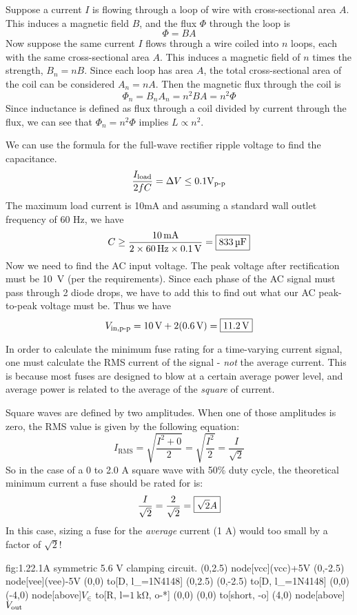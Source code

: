 Suppose a current \(I\) is flowing through a loop of wire with cross-sectional area \(A\).
This induces a magnetic field \(B\), and the flux \(\Phi\) through the loop is
\[\Phi = BA\]
Now suppose the same current \(I\) flows through a wire coiled into \(n\) loops, each with the same cross-sectional area \(A\).
This induces a magnetic field of \(n\) times the strength, \(B_n = nB\). Since each loop has area \(A\),
the total cross-sectional area of the coil can be considered \(A_n = nA\). Then the magnetic flux
through the coil is
\[\Phi_n = B_nA_n = n^2BA = n^2\Phi\]
Since inductance is defined as flux through a coil divided by current through the flux,
we can see that \(\Phi_n = n^2\Phi\) implies \(L \propto n^2\).

We can use the formula for the full-wave rectifier ripple voltage to find the capacitance.
\[\frac{I_{\text{load}}}{2fC} = \Delta V \le 0.1 \text{V}_{\text{p-p}}\]
The maximum load current is 10mA and assuming a standard wall outlet frequency of 60 Hz, we have
\[C \ge \frac{\SI{10}{\mA}}{2\times \SI{60}{\Hz} \times \SI{0.1}{\V}} = \mans{\SI{833}{\micro\farad}}\]
Now we need to find the AC input voltage. The peak voltage after rectification must be \SI{10}{\V} (per the requirements). Since each phase of the AC signal must pass through 2 diode drops, we have to add this to find out what our AC peak-to-peak voltage must be. Thus we have
\[V_{\in, \pp} = \SI{10}{\V} + 2(\SI{0.6}{\V}) = \mans{\SI{11.2}{\V}}\]

In order to calculate the minimum fuse rating for a time-varying current signal, one must calculate the RMS current of the signal - \emph{not} the average current.  This is because most fuses are designed to blow at a certain average power level, and average power is related to the average of the \textit{square} of current.

Square waves are defined by two amplitudes.  When one of those amplitudes is zero, the RMS value is given by the following equation:
\[ I_{\text{RMS}} = \sqrt{\frac{I^2 + 0}{2}} = \sqrt{\frac{I^2}{2}} = \frac{I}{\sqrt{2}}\]
So in the case of a 0 to 2.0 A square wave with 50\% duty cycle, the theoretical minimum current a fuse should be rated for is:
\[\frac{I}{\sqrt{2}} = \frac{2}{\sqrt{2}} = \boxed{\sqrt{2} A}\]
In this case, sizing a fuse for the \textit{average} current (1 A) would too small by a factor of $\sqrt{2}$!

\begin{circuit}{fig:1.22.1}{A symmetric 5.6 V clamping circuit.}
    (0,2.5) node[vcc](vcc){+5V}
    (0,-2.5) node[vee](vee){-5V}
    (0,0) to[D, l_=1N4148] (0,2.5)
    (0,-2.5) to[D, l_=1N4148] (0,0)
    (-4,0) node[above]{$V_\in$} to[R, l=$\SI{1}{\kohm}$, o-*] (0,0)
    (0,0) to[short, -o] (4,0) node[above]{$V_{\text{out}}$}
\end{circuit}

